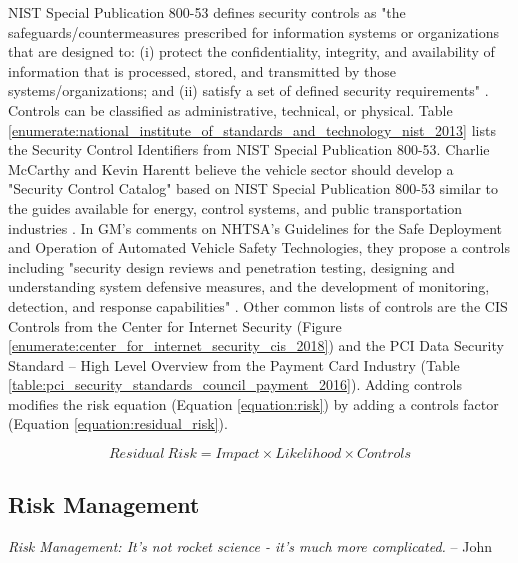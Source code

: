 \documentclass{article}
\begin{document}
NIST Special Publication 800-53 defines security controls as "the safeguards/countermeasures prescribed for information systems or organizations that are designed to: (i) protect the confidentiality, integrity, and availability of information that is processed, stored, and transmitted by those systems/organizations; and (ii) satisfy a set of defined security requirements" \citep{national_institute_of_standards_and_technology_nist_2013}. Controls can be classified as administrative, technical, or physical. Table \ref{enumerate:national_institute_of_standards_and_technology_nist_2013} lists the Security Control Identifiers from NIST Special Publication 800-53. Charlie McCarthy and Kevin Harentt believe the vehicle sector should develop a "Security Control Catalog" based on NIST Special Publication 800-53 similar to the guides available for energy, control systems, and public transportation industries \citep{mccarthy_national_2014}. In GM's comments on NHTSA's Guidelines for the Safe Deployment and Operation of Automated Vehicle Safety Technologies, they propose a controls including "security design reviews and penetration testing, designing and understanding system defensive measures, and the development of monitoring, detection, and response capabilities" \citep{national_highway_traffic_safety_administration_guidelines_2016}. Other common lists of controls are the CIS Controls from the Center for Internet Security (Figure \ref{enumerate:center_for_internet_security_cis_2018}) and the PCI Data Security Standard -- High Level Overview from the Payment Card Industry (Table \ref{table:pci_security_standards_council_payment_2016}). Adding controls modifies the risk equation (Equation \ref{equation:risk}) by adding a controls factor (Equation \ref{equation:residual_risk}). 
 
 \begin{equation}
    Residual\ Risk = Impact \times Likelihood \times Controls
    \label{equation:residual_risk}
\end{equation}

\subsection{Risk Management}

\begin{mdframed}
    \emph{Risk Management: It's not rocket science - it's much more complicated.} -- John \cite{adams_risk_2005}
\end{mdframed}
\end{document}
